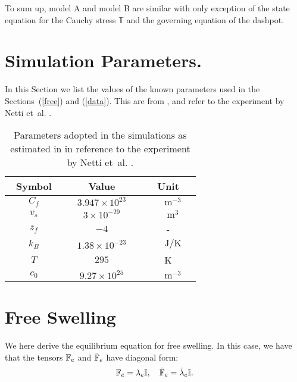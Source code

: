 To sum up, model A and model B are similar with only exception of the state equation for the Cauchy stress $\mathbb{T}$ and the governing equation of the dashpot.
\section{Simulation Parameters.}
\label{para}
In this Section we list the values of the known parameters used in the Sections~(\ref{free}) and (\ref{data}). This are from \cite{ecm2}, and refer to the experiment by Netti et~al. \cite{Netti,ecm2}.
\begin{table}[h!]
	\vspace{4mm}
	\centering
	\begin{tabular}{|c| c| c|}
		\hline\addlinespace[2pt]
		Symbol  & Value& Unit\\
		\hline\addlinespace[3pt]
		$\qquad C_f\qquad$  & $\quad3.947\times 10^{23}\quad$& $\qquad\text{m}^{-3}\quad$\\
		$\qquad v_s\qquad$  & $\quad3\times 10^{-29}\quad$& $\qquad\text{m}^3\quad$ \\
		$\qquad z_f\qquad$ & $-4$& -\\
		$\qquad k_B\qquad$ & $1.38 \times 10^{-23}$& $\qquad\text{J}/\text{K}\quad$\\
		$\qquad T\qquad$ &$295$ &K\\
		$\qquad c_0\qquad$ & $9.27\times 10^{25}$& $\qquad\text{m}^{-3}\quad$\\
		\hline
	\end{tabular}
	\vspace{4mm}
	\caption{Parameters adopted in the simulations as estimated in \cite{ecm2} in reference to the experiment by Netti et~al. \cite{Netti}.}
	\label{Tab1}
\end{table}

\section{Free Swelling}
\label{apfree}
We here derive the equilibrium equation for free swelling. In this case, we have that the tensors $\mathbb{F}_e$ and $\bar{\mathbb{F}}_e$ have diagonal form: 
\begin{equation}
\mathbb{F}_e=\lambda_e \mathbb{I},\quad \bar{\mathbb{F}}_e=\bar{\lambda}_e \mathbb{I}.
\end{equation}

